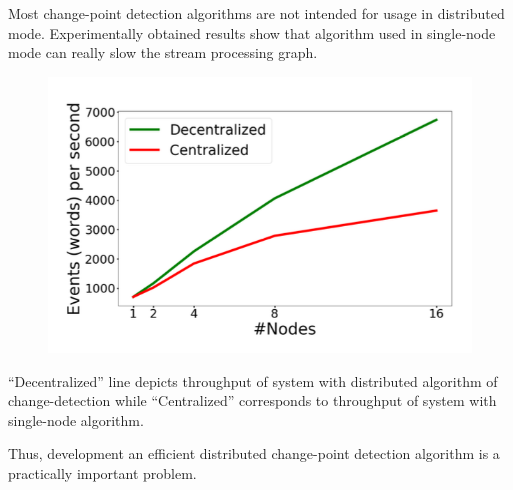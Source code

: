 Most change-point detection algorithms are not intended for usage in distributed mode. Experimentally obtained results show that algorithm used in single-node mode can really slow the stream processing graph.

\begin{figure}[h]
    \centering
    \includegraphics[scale=0.7]{throughput.png}
\end{figure}

``Decentralized'' line depicts throughput of system with distributed algorithm of change-detection while ``Centralized'' corresponds to throughput of system with single-node algorithm.

Thus, development an efficient distributed change-point detection algorithm is a practically important problem.